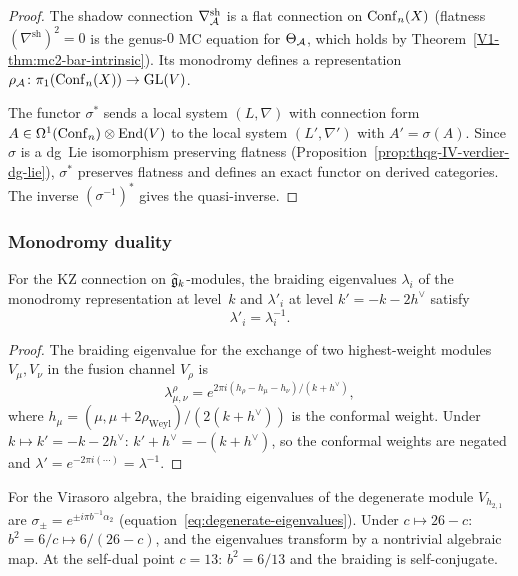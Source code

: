 \begin{proof}
The shadow connection $\nabla^{\mathrm{sh}}_{\mathcal{A}}$ is a flat connection on
$\mathrm{Conf}_n(X)$ (flatness $(\nabla^{\mathrm{sh}})^2 = 0$ is
the genus-$0$ MC equation for $\Theta_{\mathcal{A}}$, which holds by
Theorem~\ref*{V1-thm:mc2-bar-intrinsic}). Its monodromy defines a
representation $\rho_{\mathcal{A}}\colon \pi_1(\mathrm{Conf}_n(X)) \to \mathrm{GL}(V)$.

The functor $\sigma^*$ sends a local system $(L, \nabla)$ with
connection form $A \in \Omega^1(\mathrm{Conf}_n) \otimes \operatorname{End}(V)$ to the
local system $(L', \nabla')$ with $A' = \sigma(A)$. Since $\sigma$
is a dg~Lie isomorphism preserving flatness
(Proposition~\ref{prop:thqg-IV-verdier-dg-lie}), $\sigma^*$ preserves
flatness and defines an exact functor on derived categories.
The inverse $(\sigma^{-1})^*$ gives the quasi-inverse.
\end{proof}

\subsubsection{Monodromy duality}

\begin{proposition}
\label{prop:thqg-IV-monodromy-duality}
For the KZ connection on $\widehat{\mathfrak{g}}_k$-modules, the braiding
eigenvalues $\lambda_i$ of the monodromy representation at level~$k$
and $\lambda'_i$ at level $k' = -k - 2h^\vee$ satisfy
\begin{equation}%
\lambda'_i = \lambda_i^{-1}.
\end{equation}
\end{proposition}

\begin{proof}
The braiding eigenvalue for the exchange of two highest-weight modules
$V_\mu, V_\nu$ in the fusion channel $V_\rho$ is
\[
\lambda_{\mu,\nu}^\rho
= e^{2\pi i (h_\rho - h_\mu - h_\nu)/(k + h^\vee)},
\]
where $h_\mu = (\mu, \mu + 2\rho_{\mathrm{Weyl}})/(2(k + h^\vee))$ is
the conformal weight. Under $k \mapsto k' = -k - 2h^\vee$:
$k' + h^\vee = -(k + h^\vee)$, so the conformal weights are negated
and $\lambda' = e^{-2\pi i(\cdots)} = \lambda^{-1}$.
\end{proof}

\begin{remark}
For the Virasoro algebra, the braiding eigenvalues of the degenerate
module $V_{h_{2,1}}$ are $\sigma_\pm = e^{\pm i\pi b^{-1}\alpha_2}$
(equation~\eqref{eq:degenerate-eigenvalues}). Under $c \mapsto 26-c$:
$b^2 = 6/c \mapsto 6/(26-c)$, and the eigenvalues transform by a
nontrivial algebraic map. At the self-dual point $c = 13$:
$b^2 = 6/13$ and the braiding is self-conjugate.
\end{remark}

